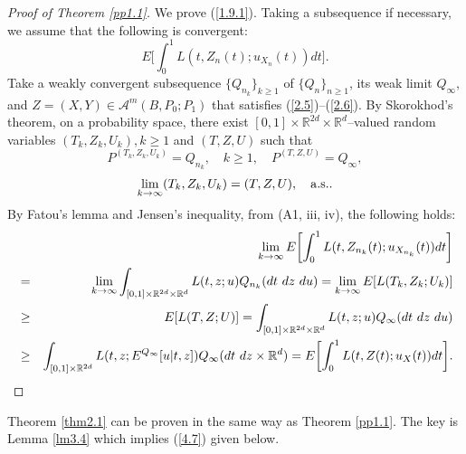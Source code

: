 \documentclass[12pt]{article}
\begin{document}
\begin{proof}[Proof of Theorem \ref{pp1.1}]
We prove (\ref{1.9.1}).
Taking a subsequence if necessary, we assume that the following  is convergent:
$$E\biggl[\int_0^1 L(t,Z_n(t);u_{X_n} (t))dt \biggr].$$
Take a weakly convergent subsequence $\{Q_{n_k}\}_{k\ge 1}$ of $\{Q_{n}\}_{n\ge 1}$,
its weak limit $Q_\infty$, and $Z=(X,Y)\in \mathcal{A}^m(B,P_0;P_1)$ that satisfies (\ref{2.5})--(\ref{2.6}).
By Skorokhod's theorem, on a probability space, there exist $[0,1]\times \mathbb{R}^{2d}\times \mathbb{R}^{d}$--valued random variables $(T_k, Z_k, U_k), k\ge 1$ and
$(T, Z, U)$ such that 
$$P^{(T_k, Z_k, U_k)}=Q_{n_k},\quad k\ge 1,\quad P^{(T, Z, U)}=Q_\infty,$$
$$\lim_{k\to\infty} (T_k, Z_k, U_k)=(T, Z, U),\quad {\rm a.s.}.$$
By Fatou's lemma and Jensen's inequality, from (A1, iii, iv), the following holds:
\begin{eqnarray}\label{4.7.0}
&&\lim_{k\to\infty}E\biggl[\int_0^1 L(t,Z_{n_k}(t);u_{X_{n_k}} (t))dt \biggr]\\
&=&\lim_{k\to\infty}
\int_{[0,1]\times \mathbb{R}^{2d}\times \mathbb{R}^{d}}
L(t,z;u)Q_{n_k}(dt\hbox{ }dz\hbox{ }du)
=\lim_{k\to\infty}E[L(T_k, Z_k;U_k)]\nonumber\\
& \ge &E[L(T, Z; U)]=\int_{[0,1]\times \mathbb{R}^{2d}\times \mathbb{R}^{d}}
L(t,z;u)Q_\infty (dt\hbox{ }dz\hbox{ }du)\nonumber\\
& \ge&\int_{[0,1]\times \mathbb{R}^{2d}}
L(t,z;E^{Q_\infty}[u|t,z])Q_\infty (dt\hbox{ }dz\times \mathbb{R}^d)
=E\biggl[\int_0^1 L(t,Z(t);u_{X} (t))dt \biggr].\nonumber
\end{eqnarray}

\end{proof}


Theorem \ref{thm2.1} can be proven in the same way as Theorem \ref{pp1.1}.
The key is Lemma \ref{lm3.4} which implies (\ref{4.7}) given below.
\end{document}
